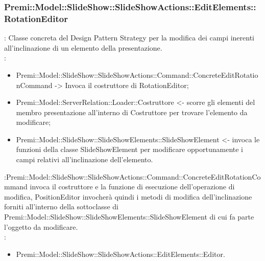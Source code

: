 {       \subsubsection{Premi::Model::SlideShow::SlideShowActions::EditElements::RotationEditor}{
				\textbf{\tipo}: Classe concreta del Design Pattern Strategy per la modifica dei campi inerenti all'inclinazione di un elemento della presentazione.\\	
				\textbf{\relaz}: 
				\begin{itemize}
					\item Premi::Model::SlideShow::SlideShowActions::Command::ConcreteEditRotationCommand -> Invoca il costruttore di RotationEditor;
                    \item Premi::Model::ServerRelation::Loader::Costruttore <- scorre gli elementi del membro presentazione all'interno di Costruttore per trovare l'elemento da modificare; 
                    \item Premi::Model::SlideShow::SlideShowElements::SlideShowElement <- invoca le funzioni della classe SlideShowElement per modificare opportunamente i campi relativi all'inclinazione dell’elemento.
				\end{itemize}	\textbf{\interfacce}:Premi::Model::SlideShow::SlideShowActions::Command::ConcreteEditRotationCommand invoca il costruttore e la funzione di esecuzione dell’operazione di modifica, PositionEditor invocherà quindi i metodi di modifica dell'inclinazione forniti all’interno della sottoclasse di Premi::Model::SlideShow::SlideShowElements::SlideShowElement di cui fa parte l’oggetto da modificare.\\
                \textbf{\base}: 
                    \begin{itemize}
                    \item Premi::Model::SlideShow::SlideShowActions::EditElements::Editor.
                    \end{itemize}
                    }
}
